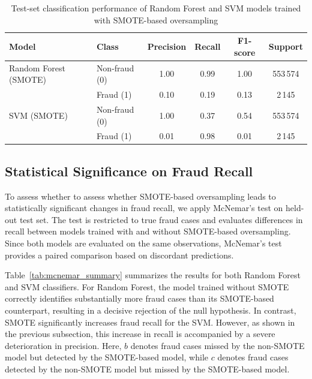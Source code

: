 \documentclass[oneside,12pt,parskip=half,american,numbers=noenddot]{scrreprt}
\begin{document}
\begin{table}[H]
\centering
\caption{Test-set classification performance of Random Forest and SVM models trained with SMOTE-based oversampling}
\label{tab:smote_model_comparison_f2}
\small
\renewcommand{\arraystretch}{1.2}
\begin{tabular}{llcccc}
\hline
\textbf{Model} & \textbf{Class} & \textbf{Precision} & \textbf{Recall} & \textbf{F1-score} & \textbf{Support} \\
\hline
Random Forest (SMOTE) & Non-fraud (0) & 1.00 & 0.99 & 1.00 & 553\,574 \\
                     & Fraud (1)     & 0.10 & 0.19 & 0.13 & 2\,145 \\
\hline
SVM (SMOTE)           & Non-fraud (0) & 1.00 & 0.37 & 0.54 & 553\,574 \\
                     & Fraud (1)     & 0.01 & 0.98 & 0.01 & 2\,145 \\
\hline
\end{tabular}
\end{table}

\subsection{Statistical Significance on Fraud Recall}
\label{statistical_significance}

To assess whether to assess whether SMOTE-based oversampling leads to statistically significant changes in fraud recall, we apply McNemar’s test on  held-out test set. The test is restricted to true fraud cases and evaluates differences in recall between models trained with and without SMOTE-based oversampling. Since both models are evaluated on the same observations, McNemar’s test provides a paired comparison based on discordant predictions.

Table~\ref{tab:mcnemar_summary} summarizes the results for both Random Forest and SVM classifiers. For Random Forest, the model trained without SMOTE correctly identifies substantially more fraud cases than its SMOTE-based counterpart, resulting in a decisive rejection of the null hypothesis. In contrast, SMOTE significantly increases fraud recall for the SVM. However, as shown in the previous subsection, this increase in recall is accompanied by a severe deterioration in precision. Here, $b$ denotes fraud cases missed by the non-SMOTE model but detected by the SMOTE-based model, while $c$ denotes fraud cases detected by the non-SMOTE model but missed by the SMOTE-based model.
\end{document}
